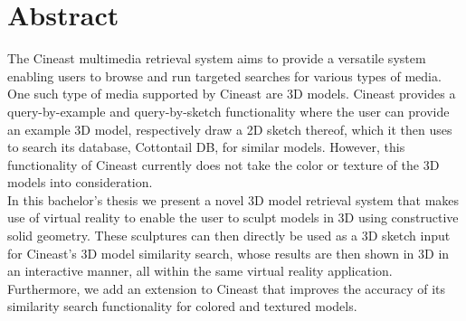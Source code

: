 \chapter{Abstract}

The Cineast multimedia retrieval system aims to provide a versatile system enabling users to browse and run targeted searches for various types of media. One such type of media supported by Cineast are 3D models.
Cineast provides a query-by-example and query-by-sketch functionality where the user can provide an example 3D model, respectively draw a 2D sketch thereof, which it then uses to search its database, Cottontail DB, for similar models. However,
this functionality of Cineast currently does not take the color or texture of the 3D models into consideration.\\
In this bachelor's thesis we present a novel 3D model retrieval system that makes use of virtual reality to enable the user to sculpt models in 3D using constructive solid geometry.
These sculptures can then directly be used as a 3D sketch input for Cineast's 3D model similarity search, whose results are then shown in 3D in an interactive manner, all within the same virtual reality application. Furthermore, we add an extension to Cineast that improves the accuracy of its similarity search functionality for colored and textured models.